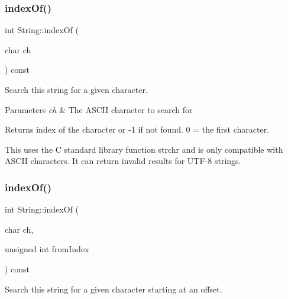 \mbox{\label{class_string_aaf945bda436edaba02fccffbdf3936c1}} 
\subsubsection{\texorpdfstring{index\+Of()}{indexOf()}\hspace{0.1cm}{\footnotesize\ttfamily [1/4]}}
{\footnotesize\ttfamily int String\+::index\+Of (\begin{DoxyParamCaption}\item[{char}]{ch }\end{DoxyParamCaption}) const}



Search this string for a given character. 


\begin{DoxyParams}{Parameters}
{\em ch} & The A\+S\+C\+II character to search for\\
\hline
\end{DoxyParams}
\begin{DoxyReturn}{Returns}
index of the character or -\/1 if not found. 0 = the first character.
\end{DoxyReturn}
This uses the C standard library function strchr and is only compatible with A\+S\+C\+II characters. It can return invalid results for U\+T\+F-\/8 strings. \mbox{\label{class_string_a0a9cb3d76e6e9b7cd1d8666cc84149ea}} 
\subsubsection{\texorpdfstring{index\+Of()}{indexOf()}\hspace{0.1cm}{\footnotesize\ttfamily [2/4]}}
{\footnotesize\ttfamily int String\+::index\+Of (\begin{DoxyParamCaption}\item[{char}]{ch,  }\item[{unsigned int}]{from\+Index }\end{DoxyParamCaption}) const}



Search this string for a given character starting at an offset. 


